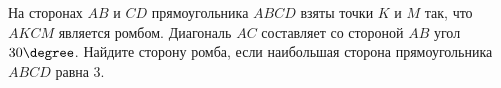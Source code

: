 \begin{ex}
	\begin{condition}
		На сторонах \( AB  \) и \( CD  \) прямоугольника \( ABCD  \) взяты точки \( K  \) и \( M \) так, что \( AKCM  \) является ромбом. Диагональ \( AC  \) составляет со стороной \( AB  \) угол \( 30\degree \). Найдите сторону ромба, если наибольшая сторона прямоугольника \( ABCD  \) равна \( 3 \).
		\end{condition}
\end{ex}